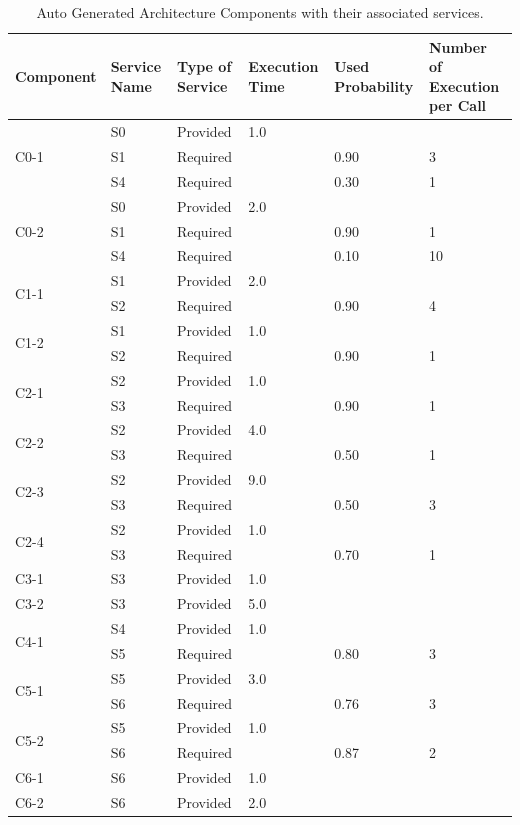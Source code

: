 \begin{table}[ht!b]
	\centering
	\begin{tabular}{|p{2cm}|p{2.5cm}|p{1.4cm}|p{1.7cm}|p{1.5cm}|p{1.8cm}|}
		\hline 
		\textbf{Component} & \textbf{Service Name} & \textbf{Type of Service} & \textbf{Execution Time} & \textbf{Used Probability} & \textbf{Number of Execution per Call} \\ 
		\hline 
		\multirow{3}{*}{C0-1} & S0 & Provided & 1.0 & & \\\cline{2-6}
		& S1 & Required & & 0.90 & 3 \\
		& S4 & Required & & 0.30 & 1 \\
		\hline 
		\multirow{3}{*}{C0-2} & S0 & Provided & 2.0 & & \\\cline{2-6}
		& S1 & Required & & 0.90 & 1 \\
		& S4 & Required & & 0.10 & 10 \\
		\hline 
		\multirow{2}{*}{C1-1} & S1 & Provided & 2.0 & & \\\cline{2-6}
		& S2 & Required & & 0.90 & 4 \\
		\hline 
		\multirow{2}{*}{C1-2} & S1 & Provided & 1.0 & & \\\cline{2-6}
		& S2 & Required & & 0.90 & 1 \\
		\hline
		\multirow{2}{*}{C2-1} & S2 & Provided & 1.0 & & \\\cline{2-6}
		& S3 & Required & & 0.90 & 1 \\
		\hline
		\multirow{2}{*}{C2-2} & S2 & Provided & 4.0 & & \\\cline{2-6}
		& S3 & Required & & 0.50 & 1 \\
		\hline
		\multirow{2}{*}{C2-3} & S2 & Provided & 9.0 & & \\\cline{2-6}
		& S3 & Required & & 0.50 & 3 \\
		\hline
		\multirow{2}{*}{C2-4} & S2 & Provided & 1.0 & & \\\cline{2-6}
		& S3 & Required & & 0.70 & 1 \\
		\hline
		C3-1 & S3 & Provided & 1.0 & & \\
		\hline
		C3-2 & S3 & Provided & 5.0 & & \\
		\hline
		\multirow{2}{*}{C4-1} & S4 & Provided & 1.0 & & \\\cline{2-6}
		& S5 & Required & & 0.80 & 3 \\
		\hline
		\multirow{2}{*}{C5-1} & S5 & Provided & 3.0 & & \\\cline{2-6}
		& S6 & Required & & 0.76 & 3 \\
		\hline
		\multirow{2}{*}{C5-2} & S5 & Provided & 1.0 & & \\\cline{2-6}
		& S6 & Required & & 0.87 & 2 \\
		\hline
		C6-1 & S6 & Provided & 1.0 & & \\
		\hline
		C6-2 & S6 & Provided & 2.0 & & \\
		\hline
	\end{tabular} 
	\caption[Auto Generated Architecture Services]{Auto Generated Architecture Components with their associated services.}
	\label{tab:ag-serv}
\end{table}

